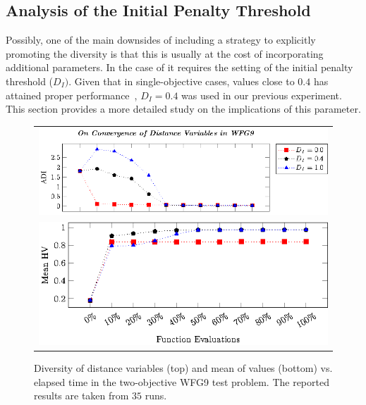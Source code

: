\subsection{Analysis of the Initial Penalty Threshold}

Possibly, one of the main downsides of including a strategy to explicitly promoting the diversity 
is that this is usually at the cost of incorporating additional parameters.
%
In the case of \AVSDMOEAD{} it requires the setting of the initial penalty threshold ($D_I)$.
%
Given that in single-objective cases, values close to $0.4$ has attained proper performance~\cite{romero2018memetic,castillo2019differential},
$D_I = 0.4$ was used in our previous experiment.
%
This section provides a more detailed study on the implications of this parameter.
%

\begin{figure}[t]
\centering
\begin{tabular}{l}
 \includegraphics[scale=0.75]{images/Diversity_Long_Term_tikz_WFG9-figure0.eps}\\[0cm]%
 \includegraphics[scale=0.75]{images/Diversity_Long_Term_tikz_WFG9-figure1.eps}\\[0cm]%
\end{tabular}
\caption{Diversity of distance variables (top) and mean of \HV{} values (bottom) vs. elapsed time in the two-objective WFG9 test problem. The reported results are taken from $35$ runs.}\label{fig:WFG9_Diversity}
\end{figure}


